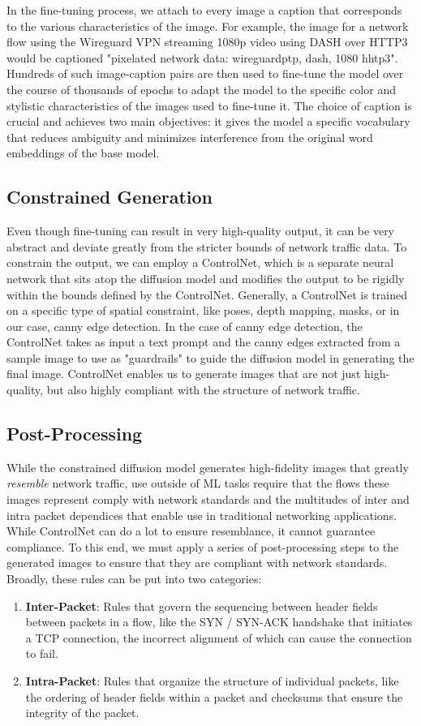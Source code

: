 \documentclass[sigconf, nonacm]{acmart}
\begin{document}
In the fine-tuning process, we attach to every image a caption that corresponds
to the various characteristics of the image. For example, the image for
a network flow using the Wireguard VPN streaming 1080p video using DASH over
HTTP3 would be captioned "pixelated network data: wireguardptp, dash, 1080 hhtp3".
Hundreds of such image-caption pairs are then used to fine-tune the model over
the course of thousands of epochs to adapt the model to the specific 
color and stylistic characteristics of the images used to fine-tune it. 
The choice of caption is crucial and achieves two main objectives:
it gives the model a specific vocabulary that reduces ambiguity and minimizes
interference from the original word embeddings of the base model.

\subsection{Constrained Generation}
Even though fine-tuning can result in very high-quality output, it can
be very abstract and deviate greatly from the stricter bounds of network 
traffic data. To constrain the output, we can employ a ControlNet, which
is a separate neural network that sits atop the diffusion model and
modifies the output to be rigidly within the bounds defined by the 
ControlNet. Generally, a ControlNet is trained on a specific type of
spatial constraint, like poses, depth mapping, masks, or in our case,
canny edge detection. In the case of canny edge detection, the ControlNet 
takes as input a text prompt and the canny edges extracted from a sample image
to use as "guardrails" to guide the diffusion model in generating the final image.
ControlNet enables us to generate images that are not just high-quality,
but also highly compliant with the structure of network traffic.

\subsection{Post-Processing}
While the constrained diffusion model generates high-fidelity images
that greatly \textit{resemble} network traffic, use outside of ML tasks
require that the flows these images represent comply with network standards 
and the multitudes of inter and intra packet dependices that enable use 
in traditional networking applications. While ControlNet can do a lot to
ensure resemblance, it cannot guarantee compliance. To this end, 
we must apply a series
of post-processing steps to the generated images to ensure that they are
compliant with network standards. Broadly, these rules can be put into two
categories:
\begin{enumerate}
  \item \textbf{Inter-Packet}: Rules that govern the sequencing between
  header fields between packets in a flow, like the SYN / SYN-ACK handshake
  that initiates a TCP connection, the incorrect alignment of which can
  cause the connection to fail.
  \item \textbf{Intra-Packet}: Rules that organize the structure of individual
  packets, like the ordering of header fields within a packet and checksums
  that ensure the integrity of the packet.
\end{enumerate}
\end{document}
